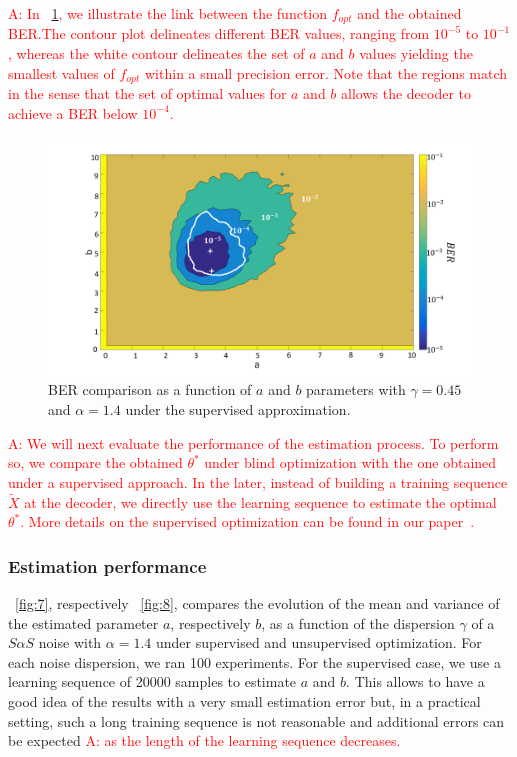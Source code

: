 \documentclass[a4paper]{IEEEtran}
\begin{document}
\textcolor{red}{A: In \figurename~\ref{fig:13}, we
  illustrate the link between the function $f_{opt}$ and the
  obtained BER.\@ The contour plot delineates different BER
  values, ranging from $10^{-5}$ to $10^{-1}$, whereas the
  white contour delineates the set of $a$ and $b$ values
  yielding the smallest values of $f_{opt}$ within a small
  precision error. Note that the regions match in the sense
  that the set of optimal values for $a$ and $b$ allows the
  decoder to achieve a BER below $10^{-4}$.}

\begin{figure}
  \centering
  \includegraphics[width=\linewidth]{fig-13}
  \caption{BER comparison as a function of $a$ and $b$
    parameters with $\gamma = 0.45$ and $\alpha=1.4$ under
    the supervised approximation.}
  \label{fig:13}
\end{figure}

\textcolor{red}{A: We will next evaluate the performance of
  the estimation process. To perform so, we compare the
  obtained $\theta^*$ under blind optimization with the one
  obtained under a supervised approach. In the later,
  instead of building a training sequence $\widetilde{X}$ at
  the decoder, we directly use the learning sequence to
  estimate the optimal $\theta^*$. More details on the
  supervised optimization can be found in our
  paper~\cite{NEEREF}.}


\subsubsection{Estimation performance}\label{subsection:EstSaS}

\figurename~\ref{fig:7}, respectively
\figurename~\ref{fig:8}, compares the evolution of the mean
and variance of the estimated parameter $a$, respectively
$b$, as a function of the dispersion $\gamma$ of a $S\alpha
S$ noise with $\alpha=1.4$ under supervised and unsupervised
optimization. For each noise dispersion, we ran 100
experiments. For the supervised case, we use a learning
sequence of 20000 samples to estimate $a$ and $b$. This
allows to have a good idea of the results with a very small
estimation error but, in a practical setting, such a long
training sequence is not reasonable and additional errors
can be expected \textcolor{red}{A: as the length of the
  learning sequence decreases.}
\end{document}
